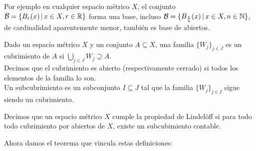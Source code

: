\documentclass[12pt,a4paper]{book}
\begin{document}
Por ejemplo en cualquier espacio métrico $X$, el conjunto $\mathcal{B} = \{ B_r(x)\,\vert\, x\in X, r \in \mathbb{R}\}$ forma una base, incluso $\mathcal{B} = \{ B_{\frac{1}{n}}(x) \,\vert\, x\in X,  n \in \mathbb{N} \}$, de cardinalidad aparentemente menor, también es base de abiertos.
\begin{defi}
Dado un espacio métrico $X$ y un conjunto $A \subseteq X$, una familia $\{W_j\}_{j \in J}$ es un cubrimiento de $A$ si $ \bigcup_{j \in J} W_j \supseteq A$.\\
Decimos que el cubrimiento es abierto (respectivamente cerrado) si todos los elementos de la familia lo son.\\
Un subcubrimiento es un subconjunto $I \subseteq J$ tal que la familia $\{W_j\}_{j \in I}$ sigue siendo un cubrimiento.
\end{defi}
\begin{defi}
Decimos que un espacio métrico $X$ cumple la propiedad de Lindelöff si para todo todo cubrimiento por abiertos de $X$, existe un subcubimiento contable.
\end{defi}
Ahora damos el teorema que vincula estas definiciones:
\end{document}
